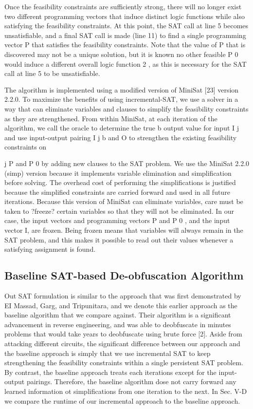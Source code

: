 \documentclass[proposal]{umassthesis}  %
\begin{document}
Once the feasibility constraints are sufficiently strong, there will no longer exist two different programming vectors that induce distinct logic functions while also satisfying the feasibility constraints. At this point, the SAT call at line 5 becomes unsatisfiable, and a final SAT call is made (line 11) to find a single programming vector P that satisfies the feasibility constraints. Note that the value of P that is discovered may not be a unique solution, but it is known no other feasible P 0 would induce a different overall logic function 2 , as this is necessary for the SAT call at line 5 to be unsatisfiable.

The algorithm is implemented using a modified version of MiniSat [23] version 2.2.0. To maximize the benefits of using incremental-SAT, we use a solver in a way that can eliminate variables and clauses to simplify the feasibility constraints as they are strengthened. From within MiniSat, at each iteration of the algorithm, we call the oracle to determine the true b output value for input I j and use input-output pairing I j b and O to strengthen the existing feasibility constraints on

j P and P 0 by adding new clauses to the SAT problem. We use the MiniSat 2.2.0 (simp) version because it implements variable elimination and simplification before solving. The overhead cost of performing the simplifications is justified because the simplified constraints are carried forward and used in all future iterations. Because this version of MiniSat can eliminate variables, care must be taken to ?freeze? certain variables so that they will not be eliminated. In our case, the input vectors and programming vectors P and P 0 , and the input vector I, are frozen. Being frozen means that variables will always remain in the SAT problem, and this makes it possible to read out their values whenever a satisfying assignment is found.
\subsection{Baseline SAT-based De-obfuscation Algorithm}
Out SAT formulation is similar to the approach that was first demonstrated by EI Massad, Garg, and Tripunitara, and we denote this earlier approach as the baseline algorithm that we compare against. Their algorithm is a significant advancement in reverse engineering, and was able to deobfuscate in minutes problems that would take years to deobfuscate using brute force [2]. Aside from attacking different circuits, the significant difference between our approach and the baseline approach is simply that we use incremental SAT to keep strengthening the feasibility constraints within a single persistent SAT problem. By contrast, the baseline approach treats each iterations except for the input-output pairings. Therefore, the baseline algorithm dose not carry forward any learned information ot simplifications from one iteration to the next. In Sec. V-D we compare the runtime of our incremental approach to the baseline approach.
\end{document}
